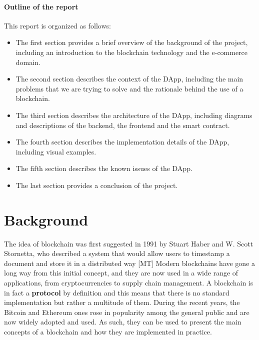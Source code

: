 \documentclass[12pt,a4paper,oneside]{article}
\theoremstyle{definition}
\begin{document}
\paragraph{Outline of the report} This report is organized as follows:
\begin{itemize}
	\item The first section provides a brief overview of the background of the project, including an introduction to the blockchain technology and the e-commerce domain.
	\item The second section describes the context of the DApp, including the main problems that we are trying to solve and the rationale behind the use of a blockchain.
	\item The third section describes the architecture of the DApp, including diagrams and descriptions of the backend, the frontend and the smart contract.
	\item The fourth section describes the implementation details of the DApp, including visual examples.
	\item The fifth section describes the known issues of the DApp.
	\item The last section provides a conclusion of the project.
\end{itemize}

\section{Background}

The idea of blockchain was first suggested in 1991 by Stuart Haber and W. Scott Stornetta, who described a system that would allow users to timestamp a document and store it in a distributed way [MT] Modern blockchains have gone a long way from this initial concept, and they are now used in a wide range of applications, from cryptocurrencies to supply chain management. A blockchain is in fact a \textbf{protocol} by definition and this means that there is no standard implementation but rather a multitude of them.
During the recent years, the Bitcoin and Ethereum ones rose in popularity among the general public and are now widely adopted and used. As such, they can be used to present the main concepts of a blockchain and how they are implemented in practice.
\end{document}
